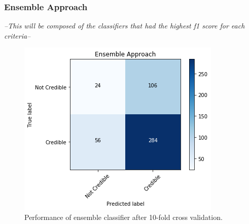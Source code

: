 \documentclass[a4paper,twoside,phd]{BYUPhys}
\begin{document}
\subsubsection{Ensemble Approach}
\label{sec:EnsembleApproachResults}

\textit{--This will be composed of the classifiers that had the highest f1 score for each criteria--}


\begin{table}[H]
	\centering
	\caption{Performance of low credibility identification task via an ensemble approach.}
	\label{table:EnsembleApproach}
\end{table}

\begin{figure}[H]
	\centering
	\includegraphics[totalheight=7cm]{images/ensemble-performance.png}
	\caption{Performance of ensemble classifier after 10-fold cross validation.}
	\label{fig:EnsemblePerformance}
\end{figure}
\end{document}
